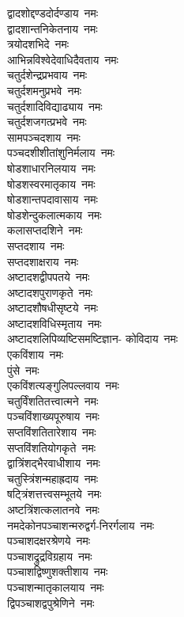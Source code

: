 \begin{multicols}{2}
\begin{flushleft}
द्वादशोद्दण्डदोर्दण्डाय~नमः\\
द्वादशान्तनिकेतनाय~नमः\\
त्रयोदशभिदे~नमः\\
आभिन्नविश्वेदेवाधिदैवताय~नमः\\
चतुर्दशेन्द्रप्रभवाय~नमः\\
चतुर्दशमनुप्रभवे~नमः\\
चतुर्दशादिविद्याढ्याय~नमः\\
चतुर्दशजगत्प्रभवे~नमः\\
सामपञ्चदशाय~नमः\hfill{}\\
पञ्चदशीशीतांशुनिर्मलाय~नमः\\
षोडशाधारनिलयाय~नमः\\
षोडशस्वरमातृकाय~नमः\\
षोडशान्तपदावासाय~नमः\\
षोडशेन्दुकलात्मकाय~नमः\\
कलासप्तदशिने~नमः\\
सप्तदशाय~नमः\\
सप्तदशाक्षराय~नमः\\
अष्टादशद्वीपपतये~नमः\\
अष्टादशपुराणकृते~नमः\hfill{}\\
अष्टादशौषधीसृष्टये~नमः\\
अष्टादशविधिस्मृताय~नमः\\
अष्टादशलिपिव्यष्टिसमष्टिज्ञान- कोविदाय~नमः\\
एकविंशाय~नमः\\
पुंसे~नमः\\
एकविंशत्यङ्गुलिपल्लवाय~नमः\\
चतुर्विंशतितत्त्वात्मने~नमः\\
पञ्चविंशाख्यपूरुषाय~नमः\\
सप्तविंशतितारेशाय~नमः\\
सप्तविंशतियोगकृते~नमः\hfill{}\\
द्वात्रिंशद्भैरवाधीशाय~नमः\\
चतुस्त्रिंशन्महाह्रदाय~नमः\\
षट्त्रिंशत्तत्त्वसम्भूतये~नमः\\
अष्टत्रिंशत्कलातनवे~नमः\\
नमदेकोनपञ्चाशन्मरुद्वर्ग-निरर्गलाय~नमः\\
पञ्चाशदक्षरश्रेणये~नमः\\
पञ्चाशद्रुद्रविग्रहाय~नमः\\
पञ्चाशद्विष्णुशक्तीशाय~नमः\\
पञ्चाशन्मातृकालयाय~नमः\\
द्विपञ्चाशद्वपुश्रेणिने~नमः\hfill{}\\

\end{flushleft}
\end{multicols}
